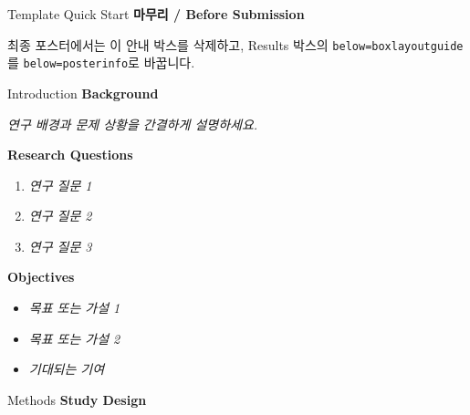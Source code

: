 \documentclass[a0paper,portrait]{KNUE_baposter}
\newcommand{\TemplateText}[1]{{\color{aaublue2}\itshape #1}}
\begin{document}
\begin{poster}
\begin{posterbox}[name=boxlayoutguide,column=2,below=posterinfo]{Template Quick Start}
\vspace{0.25em}
\textbf{마무리 / Before Submission}

최종 포스터에서는 이 안내 박스를 삭제하고, Results 박스의 \texttt{below=boxlayoutguide}를 \texttt{below=posterinfo}로 바꿉니다.
\end{posterbox}

%
\begin{posterbox}[name=introduction,column=0,below=abstract]{Introduction}
\footnotesize
\textbf{Background}

\scriptsize
\TemplateText{연구 배경과 문제 상황을 간결하게 설명하세요.}

\vspace{0.6em}
\footnotesize
\textbf{Research Questions}

\scriptsize
\begin{enumerate}
\item \TemplateText{연구 질문 1}
\item \TemplateText{연구 질문 2}
\item \TemplateText{연구 질문 3}
\end{enumerate}

\vspace{0.6em}
\footnotesize
\textbf{Objectives}

\scriptsize
\begin{itemize}
\item \TemplateText{목표 또는 가설 1}
\item \TemplateText{목표 또는 가설 2}
\item \TemplateText{기대되는 기여}
\end{itemize}
\end{posterbox}

%
\begin{posterbox}[name=methods,column=1,below=abstract]{Methods}
\footnotesize
\textbf{Study Design}


\end{posterbox}
\end{poster}
\end{document}
